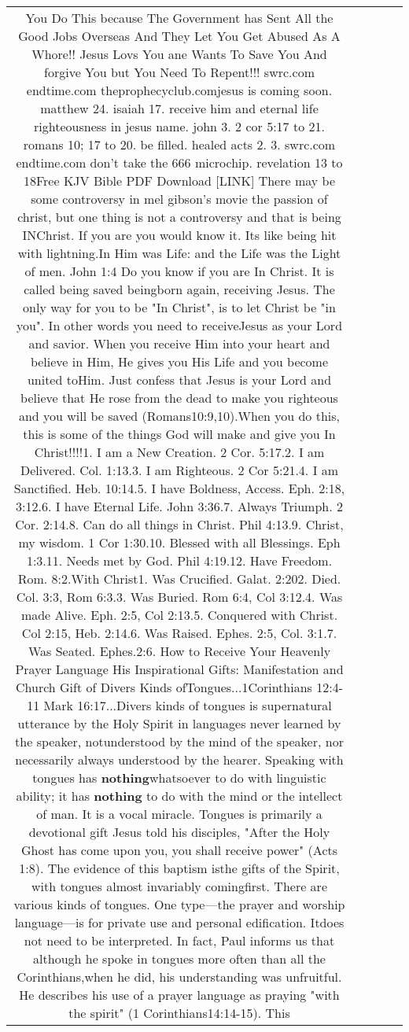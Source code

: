 \documentclass[11pt]{article}
\newlength\mylength
\begin{document}
\begin{center}
\begin{longtable}{|C{.65\mylength}|C{.30\mylength}|C{.12\mylength}|C{.12\mylength}|C{.12\mylength}|}
  \small You Do This because The Government has Sent All the Good Jobs Overseas And They Let You Get Abused As A Whore!!  Jesus Lovs You ane Wants To Save You And forgive You but You Need To Repent!!!  swrc.com  endtime.com  theprophecyclub.comjesus is coming soon. matthew 24. isaiah 17. receive him and eternal life righteousness in jesus name. john 3. 2 cor 5:17 to 21. romans 10; 17 to 20. be filled. healed acts 2. 3. swrc.com endtime.com don't take the 666 microchip. revelation 13 to 18Free KJV Bible PDF Download   [LINK] There may be some controversy in mel gibson's movie the passion of christ, but one thing is not a controversy and that is being INChrist.  If you are you would know it. Its like being hit with lightning.In Him was Life: and the Life was the Light of men. John 1:4  Do you know if you are In Christ. It is called being saved beingborn again, receiving Jesus. The only way for you to be "In Christ", is to let Christ be "in you". In other words you need to receiveJesus as your Lord and savior. When you receive Him into your heart and believe in Him, He gives you His Life and you become united toHim.  Just confess that Jesus is your Lord and believe that He rose from the dead to make you righteous and you will be saved (Romans10:9,10).When you do this, this is some of the things God will make and give you In Christ!!!!1. I am a New Creation. 2 Cor. 5:17.2. I am Delivered. Col. 1:13.3. I am Righteous. 2 Cor 5:21.4. I am Sanctified. Heb. 10:14.5. I have Boldness, Access. Eph. 2:18, 3:12.6. I have Eternal Life. John 3:36.7. Always Triumph. 2 Cor. 2:14.8. Can do all things in Christ. Phil 4:13.9. Christ, my wisdom. 1 Cor 1:30.10. Blessed with all Blessings. Eph 1:3.11. Needs met by God. Phil 4:19.12. Have Freedom. Rom. 8:2.With Christ1. Was Crucified. Galat. 2:202. Died. Col. 3:3, Rom 6:3.3. Was Buried. Rom 6:4, Col 3:12.4. Was made Alive. Eph. 2:5, Col 2:13.5. Conquered with Christ. Col 2:15, Heb. 2:14.6. Was Raised. Ephes. 2:5, Col. 3:1.7. Was Seated. Ephes.2:6.  How to Receive Your Heavenly Prayer Language  His Inspirational Gifts:  Manifestation and Church Gift of Divers Kinds ofTongues...1Corinthians 12:4-11  Mark 16:17...Divers kinds of tongues is supernatural utterance by the Holy Spirit in languages never learned by the speaker, notunderstood by the mind of the speaker, nor necessarily always understood by the hearer. Speaking with tongues has \textbf{nothing}whatsoever to do with linguistic ability; it has \textbf{nothing} to do with the mind or the intellect of man. It is a vocal miracle.  Tongues is primarily a devotional gift  Jesus told his disciples, "After the Holy Ghost has come upon you, you shall receive power" (Acts 1:8). The evidence of this baptism isthe gifts of the Spirit, with tongues almost invariably comingfirst. There are various kinds of tongues. One type—the prayer and worship language—is for private use and personal edification. Itdoes not need to be interpreted. In fact, Paul informs us that although he spoke in tongues more often than all the Corinthians,when he did, his understanding was unfruitful. He describes his use of a prayer language as praying "with the spirit" (1 Corinthians14:14-15). This 
\end{longtable}
\end{center}
\end{document}
